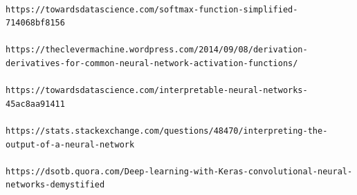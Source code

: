 \begin{lstlisting}

https://towardsdatascience.com/softmax-function-simplified-714068bf8156

https://theclevermachine.wordpress.com/2014/09/08/derivation-derivatives-for-common-neural-network-activation-functions/

https://towardsdatascience.com/interpretable-neural-networks-45ac8aa91411

https://stats.stackexchange.com/questions/48470/interpreting-the-output-of-a-neural-network

https://dsotb.quora.com/Deep-learning-with-Keras-convolutional-neural-networks-demystified
\end{lstlisting} 